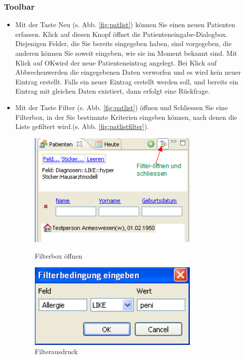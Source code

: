 \subsubsection{Toolbar}
\begin{itemize}
  \item Mit der Taste \glqq Neu\grqq{} (s. Abb. \ref{fig:patlist}) können Sie
  einen neuen Patienten erfassen. Klick
  auf diesen Knopf öffnet die Patienteneingabe-Dialogbox. Diejenigen Felder, die
  Sie bereits eingegeben haben, sind vorgegeben, die anderen können Sie soweit
  eingeben, wie sie im Moment bekannt sind. Mit Klick auf \glqq OK\grqq{}wird
  der neue Patienteneintrag angelegt. Bei Klick auf \glqq Abbrechen\grqq{}werden
  die eingegebenen Daten verworfen und es wird kein neuer Eintrag erstellt.
  Falls ein neuer Eintrag erstellt werden soll, und bereits ein Eintrag mit
  gleichen Daten existiert, dann erfolgt eine Rückfrage.

  \item Mit der Taste \glqq Filter\grqq{} (s. Abb. \ref{fig:patlist}) öffnen und Schliessen Sie eine Filterbox, in der Sie bestimmte Kriterien eingeben können, nach denen die Liste gefiltert wird.(s. Abb. \ref{fig:patlistfilter}).
	\begin{figure}[ht]
        \begin{minipage}{0.5\textwidth}
        \centering
    	\includegraphics[width=0.8\textwidth]{images/patlistfilter}
    	\caption{Filterbox öffnen}
    	\label{fig:patlistfilter}
        \end{minipage}\hfill
        \begin{minipage}{0.5\textwidth}
        \centering
        \includegraphics[width=0.8\textwidth]{images/patlistfilter2}
        \caption{Filterausdruck}\label{fig:filterexpr}
        \end{minipage}
    \end{figure}
\end{itemize}

